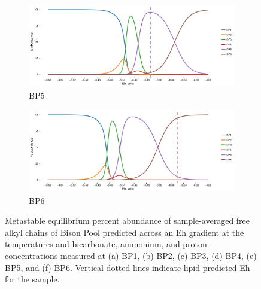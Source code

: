 \begin{figure}[h]\ContinuedFloat

    \begin{subfigure}[b]{\linewidth}
    	\includegraphics[width=\linewidth]{"figs_ch2/Bison OF5_thermo"}
    	\caption{BP5}
        \label{fig:BP5_thermo}
    \end{subfigure}
    \begin{subfigure}[b]{\linewidth}
    	\includegraphics[width=\linewidth]{"figs_ch2/Bison OF6_thermo"}
    	\caption{BP6}
        \label{fig:BP6_thermo}
    \end{subfigure}
    
    \caption[Predicted metastable equilibrium abundance of sample-averaged free alkyl chains of Bison Pool samples]{Metastable equilibrium percent abundance of sample-averaged free alkyl chains of Bison Pool predicted across an Eh gradient at the temperatures and bicarbonate, ammonium, and proton concentrations measured at (a) BP1, (b) BP2, (c) BP3, (d) BP4, (e) BP5, and (f) BP6. Vertical dotted lines indicate lipid-predicted Eh for the sample.}
    \label{fig:bison_thermo}
\end{figure}
\doublespace


